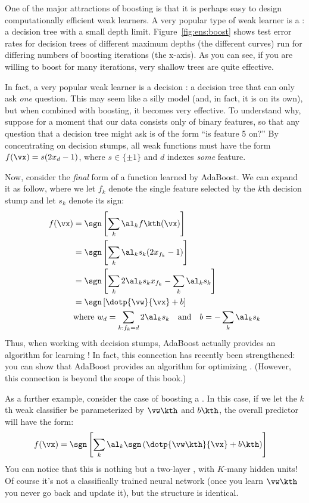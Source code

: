 
One of the major attractions of boosting is that it is perhaps easy to
design computationally efficient weak learners.  A very popular type
of weak learner is a : a decision tree
with a small depth limit.  Figure~\ref{fig:ens:boost} shows test error
rates for decision trees of different maximum depths (the different
curves) run for differing numbers of boosting iterations (the
x-axis).  As you can see, if you are willing to boost for many
iterations, very shallow trees are quite effective.

In fact, a very popular weak learner is a decision : a decision tree that can only ask \emph{one} question.  This
may seem like a silly model (and, in fact, it is on its own), but
when combined with boosting, it becomes very effective.  To understand
why, suppose for a moment that our data consists only of binary
features, so that any question that a decision tree might ask is of
the form ``is feature 5 on?''  By concentrating on decision stumps,
all weak functions must have the form $f(\vx) = s (2 x_d - 1)$, where
$s \in \{\pm 1\}$ and $d$ indexes \emph{some} feature.


Now, consider the \emph{final} form of a function learned by
AdaBoost.  We can expand it as follow, where we let $f_k$ denote the
single feature selected by the $k$th decision stump and let $s_k$
denote its sign:
%
\begin{align}
f(\vx) 
&= \sgn\left[ \sum_k \al_k f\kth(\vx) \right] \\
&= \sgn\left[ \sum_k \al_k s_k (2 x_{f_k} - 1) \right] \\
&= \sgn\left[ \sum_k 2 \al_k s_k x_{f_k} - \sum_k \al_k s_k \right] \\
&= \sgn\left[ \dotp{\vw}{\vx} + b \right] \\
& \text{where }
w_d = \sum_{k : f_k=d} 2 \al_k s_k \quad \text{and} \quad
b   = - \sum_k \al_k s_k
\end{align}
%
Thus, when working with decision stumps, AdaBoost actually provides an
algorithm for learning !  In fact, this
connection has recently been strengthened: you can show that AdaBoost
provides an algorithm for optimizing .
(However, this connection is beyond the scope of this book.)

As a further example, consider the case of boosting a .  In this case, if we let the $k$th weak classifier be
parameterized by $\vw\kth$ and $b\kth$, the overall predictor will
have the form:
%
\begin{align}
f(\vx)
&= \sgn\left[ \sum_k \al_k \sgn\left( \dotp{\vw\kth}{\vx}+b\kth \right) \right]
\end{align}
%
You can notice that this is nothing but a two-layer , with $K$-many hidden units!  Of course it's not a
classifically trained neural network (once you learn $\vw\kth$ you
never go back and update it), but the structure is identical.

